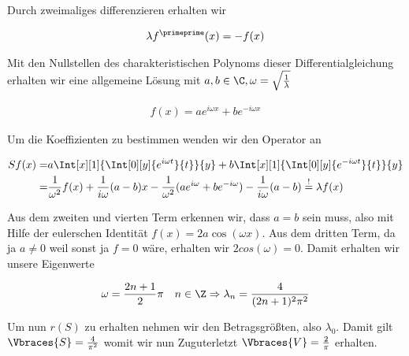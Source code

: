 \begin{solution}
Durch zweimaliges differenzieren erhalten wir

\begin{align*}
  \lambda f^\primeprime(x) = -f(x)
\end{align*}

Mit den Nullstellen des charakteristischen Polynoms dieser Differentialgleichung
erhalten wir eine allgemeine Lösung mit $a,b \in \C, \omega = \sqrt{\frac{1}{\lambda}}$

\begin{align*}
  f(x) = a e^{i\omega x} + b e^{-i \omega x}
\end{align*}

Um die Koeffizienten zu bestimmen wenden wir den Operator an

\begin{align*}
  Sf(x)
  =&
  a \Int[x][1]{
    \Int[0][y]{e^{i\omega t}}{t}
  }{y}
  +
  b \Int[x][1]{
      \Int[0][y]{e^{-i\omega t}}{t}
  }{y} \\
  =&
  \frac{1}{\omega^2} f(x)
  +
  \frac{1}{i\omega} (a-b)x
  -
  \frac{1}{\omega^2}(ae^{i\omega} + be^{-i\omega})
  -
  \frac{1}{i\omega}(a-b)
  \stackrel{!}{=}
  \lambda f(x)
\end{align*}

Aus dem zweiten und vierten Term erkennen wir, dass $a=b$ sein muss, also mit
Hilfe der eulerschen Identität $f(x) = 2a \cos(\omega x)$. Aus dem dritten Term,
da ja $a \neq 0$ weil sonst ja $f = 0$ wäre, erhalten wir $2cos(\omega) = 0$. Damit
erhalten wir unsere Eigenwerte

\begin{align*}
  \omega
  =
  \frac{2n+1}{2} \pi     \quad n \in \Z
  \Rightarrow
  \lambda_n
  =
  \frac{4}{(2n+1)^2 \pi^2}
\end{align*}

Um nun $r(S)$ zu erhalten nehmen wir den Betragsgrößten, also $\lambda_0$.
Damit gilt $\Vbraces{S} = \frac{4}{\pi^2}$ womit wir nun Zuguterletzt
$\Vbraces{V} = \frac{2}{\pi}$ erhalten.
\end{solution}
